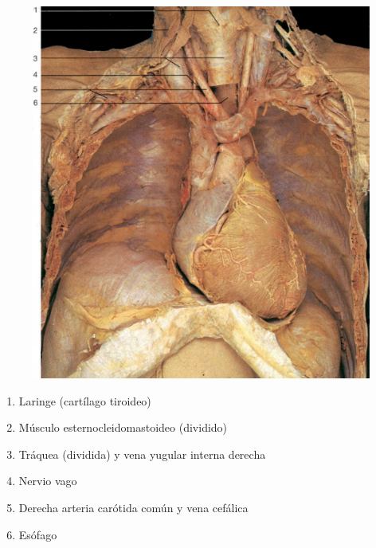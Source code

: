 \begin{figure}[H]
	\begin{center}
 		\includegraphics[width = 1\textwidth]{v2/images/image42.png}
	\end{center} 
\end{figure}
\begin{enumerate}
    \item Laringe (cartílago tiroideo)
    \item Músculo esternocleidomastoideo (dividido)
    \item Tráquea (dividida) y vena yugular interna derecha
    \item Nervio vago
    \item Derecha arteria carótida común y vena cefálica
    \item Esófago    
\end{enumerate}

